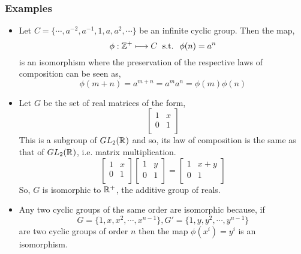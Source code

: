 \documentclass[MathsNotesBase.tex]{subfiles}
\begin{document}
{		\subsubsection{Examples}
		\begin{itemize}
			\item{
				Let $C = \{ \cdots, a^{-2}, a^{-1}, 1, a, a^2, \cdots \}$ be an infinite cyclic group. Then the map,
				\[ \phi : \mathbb{Z}^{+} \longmapsto C \; \text{ s.t. } \; \phi(n) = a^n \]
				is an isomorphism where the preservation of the respective laws of composition can be seen as,
				\[ \phi(m + n) = a^{m + n} = a^ma^n = \phi(m)\phi(n) \]
			}
			\item{Let $G$ be the set of real matrices of the form,
				\[
				\begin{bmatrix}
				1 & x 	\\
				0 & 1 	\\
				\end{bmatrix} 
				\]
				This is a subgroup of $GL_2(\mathbb{R}^{})$ and so, its law of composition is the same as that of $GL_2(\mathbb{R}^{})$, i.e. matrix multiplication.
				\[
				\begin{bmatrix}
				1 & x 	\\
				0 & 1 	\\
				\end{bmatrix}
				\begin{bmatrix}
				1 & y 	\\
				0 & 1 	\\
				\end{bmatrix} = 
				\begin{bmatrix}
				1 & x + y\\
				0 & 1 	\\
				\end{bmatrix}
				\]
				So, $G$ is isomorphic to $\mathbb{R}^{+}$, the additive group of reals.
			}
			\item{Any two cyclic groups of the same order are isomorphic because, if
				\[ G = \{1, x, x^2, \cdots, x^{n-1}\}, G' = \{1, y, y^2, \cdots, y^{n-1}\} \]
				are two cyclic groups of order $n$ then the map $\phi(x^i) = y^i$ is an isomorphism.
			}
		\end{itemize}
		
		
}
\end{document}
